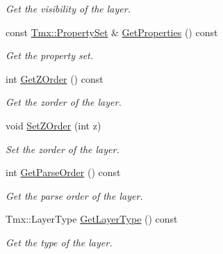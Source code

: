 \begin{DoxyCompactItemize}
\begin{DoxyCompactList}\small\item\em Get the visibility of the layer. \end{DoxyCompactList}\item 
\hypertarget{classTmx_1_1Layer_ac404e49efb50d98afcb468283dc20640}{const \hyperlink{classTmx_1_1PropertySet}{Tmx\-::\-Property\-Set} \& \hyperlink{classTmx_1_1Layer_ac404e49efb50d98afcb468283dc20640}{Get\-Properties} () const }\label{classTmx_1_1Layer_ac404e49efb50d98afcb468283dc20640}

\begin{DoxyCompactList}\small\item\em Get the property set. \end{DoxyCompactList}\item 
\hypertarget{classTmx_1_1Layer_a6d77cf7f59bf82be8c97d7d6ab26bfae}{int \hyperlink{classTmx_1_1Layer_a6d77cf7f59bf82be8c97d7d6ab26bfae}{Get\-Z\-Order} () const }\label{classTmx_1_1Layer_a6d77cf7f59bf82be8c97d7d6ab26bfae}

\begin{DoxyCompactList}\small\item\em Get the zorder of the layer. \end{DoxyCompactList}\item 
\hypertarget{classTmx_1_1Layer_ac467e3cb03d7e9a1d8199d4b33f5a78b}{void \hyperlink{classTmx_1_1Layer_ac467e3cb03d7e9a1d8199d4b33f5a78b}{Set\-Z\-Order} (int z)}\label{classTmx_1_1Layer_ac467e3cb03d7e9a1d8199d4b33f5a78b}

\begin{DoxyCompactList}\small\item\em Set the zorder of the layer. \end{DoxyCompactList}\item 
\hypertarget{classTmx_1_1Layer_a27687188f81c797c3a3c8a62bf7282ff}{int \hyperlink{classTmx_1_1Layer_a27687188f81c797c3a3c8a62bf7282ff}{Get\-Parse\-Order} () const }\label{classTmx_1_1Layer_a27687188f81c797c3a3c8a62bf7282ff}

\begin{DoxyCompactList}\small\item\em Get the parse order of the layer. \end{DoxyCompactList}\item 
\hypertarget{classTmx_1_1Layer_ab34f5b1a9ad759005b5bdb88974b233f}{Tmx\-::\-Layer\-Type \hyperlink{classTmx_1_1Layer_ab34f5b1a9ad759005b5bdb88974b233f}{Get\-Layer\-Type} () const }\label{classTmx_1_1Layer_ab34f5b1a9ad759005b5bdb88974b233f}

\begin{DoxyCompactList}\small\item\em Get the type of the layer. \end{DoxyCompactList}\end{DoxyCompactItemize}


